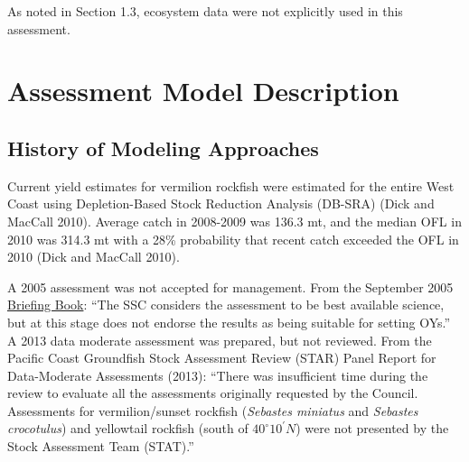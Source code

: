 \documentclass[11pt,
  english,
]{article}
\begin{document}
\leavevmode\tagmcend\tagstructend

As noted in Section 1.3, ecosystem data were not explicitly used in this assessment.


\hypertarget{assessment-model-description}{%
\section{Assessment Model Description}\label{assessment-model-description}}

\leavevmode\tagmcend\tagstructend


\hypertarget{history-of-modeling-approaches}{%
\subsection{History of Modeling Approaches}\label{history-of-modeling-approaches}}

\leavevmode\tagmcend\tagstructend

Current yield estimates for vermilion rockfish were estimated for the entire West Coast using Depletion-Based Stock Reduction Analysis (DB-SRA) {(Dick and MacCall 2010)\leavevmode\tagmcend\tagstructend}. Average catch in 2008-2009 was 136.3 mt, and the median OFL in 2010 was 314.3 mt with a 28\% probability that recent catch exceeded the OFL in 2010 {(Dick and MacCall 2010)\leavevmode\tagmcend\tagstructend}.

A 2005 assessment was not accepted for management. From the September 2005 {\href{https://www.pcouncil.org/documents/2005/09/f-groundfish-management-september-2005.pdf/}{Briefing Book}\leavevmode\tagmcend\tagstructend}: ``The SSC considers the assessment to be best available science, but at this stage does not endorse the results as being suitable for setting OYs.'' A 2013 data moderate assessment was prepared, but not reviewed. From the Pacific Coast Groundfish Stock Assessment Review (STAR) Panel Report for Data-Moderate Assessments (2013): ``There was insufficient time during the review to evaluate all the assessments originally requested by the Council. Assessments for vermilion/sunset rockfish (\emph{Sebastes miniatus} and \emph{Sebastes crocotulus}) and yellowtail rockfish (south of $40^\circ 10^\prime N$) were not presented by the Stock Assessment Team (STAT).''
\end{document}
